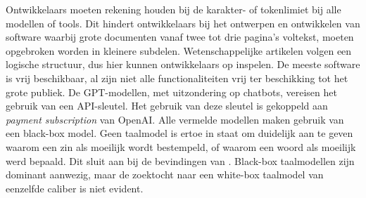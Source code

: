 \begin{table}[H]
	\centering
\end{table}

Ontwikkelaars moeten rekening houden bij de karakter- of tokenlimiet bij alle modellen of tools. Dit hindert ontwikkelaars bij het ontwerpen en ontwikkelen van software waarbij grote documenten vanaf twee tot drie pagina's voltekst, moeten opgebroken worden in kleinere subdelen. Wetenschappelijke artikelen volgen een logische structuur, dus hier kunnen ontwikkelaars op inspelen. De meeste software is vrij beschikbaar, al zijn niet alle functionaliteiten vrij ter beschikking tot het grote publiek. De GPT-modellen, met uitzondering op chatbots, vereisen het gebruik van een API-sleutel. Het gebruik van deze sleutel is gekoppeld aan \textit{payment subscription} van OpenAI. Alle vermelde modellen maken gebruik van een black-box model. Geen taalmodel is ertoe in staat om duidelijk aan te geven waarom een zin als moeilijk wordt bestempeld, of waarom een woord als moeilijk werd bepaald. Dit sluit aan bij de bevindingen van \textcite{Gooding2022}. Black-box taalmodellen zijn dominant aanwezig, maar de zoektocht naar een white-box taalmodel van eenzelfde caliber is niet evident.

